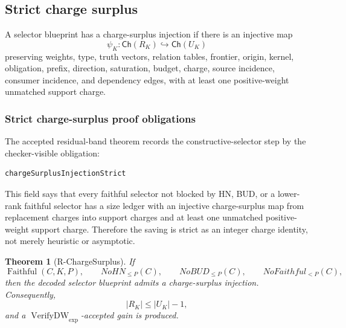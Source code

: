 \documentclass[10.5pt,a4paper]{article}
\newtheorem{theorem}{Theorem}[section]
\newcommand{\Ch}{\mathsf{Ch}}
\newcommand{\VerifyDW}{\operatorname{VerifyDW}_{\exp}}
\newcommand{\Faithful}{\operatorname{Faithful}}
\begin{document}
\subsection{Strict charge surplus}
A selector blueprint has a charge-surplus injection if there is an injective map
\[
\psi_K:\Ch(R_K)\hookrightarrow\Ch(U_K)
\]
preserving weights, type, truth vectors, relation tables, frontier, origin, kernel, obligation, prefix, direction, saturation, budget, charge, source incidence, consumer incidence, and dependency edges, with at least one positive-weight unmatched support charge.

\subsubsection{Strict charge-surplus proof obligations}
The accepted residual-band theorem records the constructive-selector step by the checker-visible obligation:
\begin{lstlisting}
chargeSurplusInjectionStrict
\end{lstlisting}
This field says that every faithful selector not blocked by HN, BUD, or a lower-rank faithful selector has a size ledger with an injective charge-surplus map from replacement charges into support charges and at least one unmatched positive-weight support charge.  Therefore the saving is strict as an integer charge identity, not merely heuristic or asymptotic.

\begin{theorem}[R-ChargeSurplus]
If
\[
\Faithful(C,K,P),\qquad NoHN_{\le P}(C),\qquad NoBUD_{\le P}(C),\qquad NoFaithful_{<P}(C),
\]
then the decoded selector blueprint admits a charge-surplus injection. Consequently,
\[
|R_K|\le |U_K|-1,
\]
and a \(\VerifyDW\)-accepted gain is produced.
\end{theorem}
\end{document}
